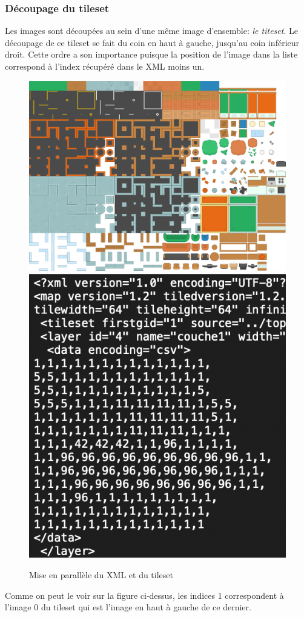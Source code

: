 \documentclass[a4paper,12pt]{article} %
\begin{document}
\subsubsection{Découpage du tileset}
Les images sont découpées au sein d'une même image d'ensemble: \textit{le titeset}. Le découpage de ce tileset se fait du coin en haut à gauche, jusqu'au coin inférieur droit. Cette ordre a son importance puisque la position de l'image dans la liste correspond à l'index récupéré dans le XML moins un.
\begin{figure}[!h]
\centering
\includegraphics[scale=0.12]{images/tileset.png}
\includegraphics[scale=0.5]{images/XML.png}
\caption{Mise en parallèle du XML et du tileset}
\end{figure}
\newline
Comme on peut le voir sur la figure ci-dessus, les indices 1 correspondent à l'image 0 du tileset qui est l'image en haut à gauche de ce dernier.
\end{document}
